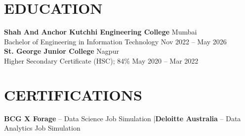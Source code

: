 \documentclass[10pt,a4paper]{article}
\begin{document}
\section*{EDUCATION}
\textbf{Shah And Anchor Kutchhi Engineering College} \hfill Mumbai\\
Bachelor of Engineering in Information Technology \hfill Nov 2022 -- May 2026\\[2.5pt]
\textbf{St. George Junior College} \hfill Nagpur\\
Higher Secondary Certificate (HSC); 84\% \hfill May 2020 -- Mar 2022

\vspace{1pt}

\section*{CERTIFICATIONS}
\textbf{BCG X Forage} -- Data Science Job Simulation \quad|\quad \textbf{Deloitte Australia} -- Data Analytics Job Simulation
\end{document}
